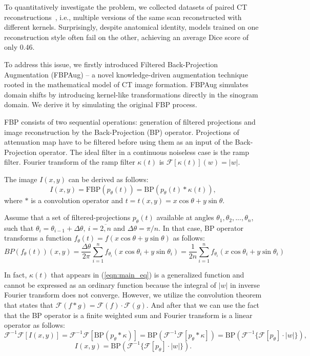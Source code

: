 To quantitatively investigate the problem, we collected datasets of paired CT reconstructions~\cite{morozov2020mosmeddata,tsai2021rsna}, i.e., multiple versions of the same scan reconstructed with different kernels. Surprisingly, despite anatomical identity, models trained on one reconstruction style often fail on the other, achieving an average Dice score of only 0.46.

To address this issue, we firstly introduced Filtered Back-Projection Augmentation (FBPAug) -- a novel knowledge-driven augmentation technique rooted in the mathematical model of CT image formation. FBPAug simulates domain shifts by introducing kernel-like transformations directly in the sinogram domain. We derive it by simulating the original FBP process.

FBP consists of two sequential operations: generation of filtered projections and image reconstruction by the Back-Projection (BP) operator. Projections of attenuation map have to be filtered before using them as an input of the Back-Projection operator. The ideal filter in a continuous noiseless case is the ramp filter. Fourier transform of the ramp filter $\kappa(t)$ is $\mathcal{F}[\kappa(t)](w) = |w|$.

The image $I(x, y)$ can be derived as follows:
\begin{equation}
	\label{eqn:main_eq}
	I(x, y) = \text{FBP}(p_\theta(t)) = \text{BP}(p_\theta(t) * \kappa(t)),
\end{equation}
where $*$ is a convolution operator and $t = t(x,y) = x\cos\theta + y\sin\theta$.%

Assume that a set of filtered-projections $p_{\theta}(t)$ available at angles $\theta_1, \theta_2, ..., \theta_n$, such that $\theta_i = \theta_{i - 1} + \Delta\theta,~i=\overline{2,n}$ and $\Delta\theta = \pi / n$. In that case, BP operator transforms a function $f_\theta(t) = f(x\cos\theta + y\sin\theta)$ as follows:
\[
BP(f_\theta(t))(x, y) = \frac{\Delta\theta}{2\pi}\sum\limits_{i=1}^n f_{\theta_i}(x\cos\theta_i + y\sin\theta_i) = \frac{1}{2n}\sum\limits_{i=1}^n f_{\theta_i}(x\cos\theta_i + y\sin\theta_i)
\]

In fact, $\kappa(t)$ that appears in (\ref{eqn:main_eq}) is a generalized function and cannot be expressed as an ordinary function because the integral of $|w|$ in inverse Fourier transform does not converge. However, we utilize the convolution theorem that states that $\mathcal{F}(f*g) = \mathcal{F}(f)\cdot\mathcal{F}(g)$. And after that we can use the fact that the BP operator is a finite weighted sum and Fourier transform is a linear operator as follows:
\[
\mathcal{F}^{-1}\mathcal{F}[I(x, y)] = \mathcal{F}^{-1}\mathcal{F}[\text{BP}(p_\theta * \kappa)] = \text{BP}(\mathcal{F}^{-1}\mathcal{F}[p_\theta * \kappa]) = \text{BP}(\mathcal{F}^{-1}\{\mathcal{F}[p_\theta]\cdot|w|\}),\]
\[I(x, y) = \text{BP}\left(\mathcal{F}^{-1}\{\mathcal{F}[p_\theta]\cdot|w|\}\right).\]


